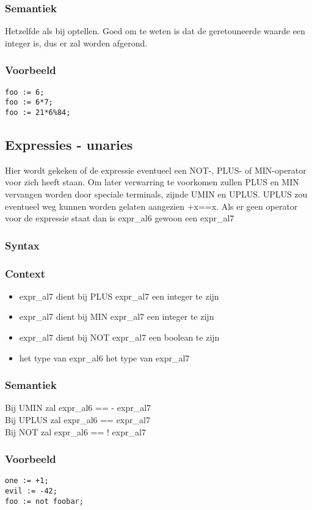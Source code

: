 \documentclass[]{article}
\begin{document}
\subsubsection{Semantiek}
Hetzelfde als bij optellen. Goed om te weten is dat de geretouneerde waarde een integer is, dus er zal worden afgerond.
\subsubsection{Voorbeeld}
\begin{lstlisting}[style=SELMA]
foo := 6;
foo := 6*7;
foo := 21*6%84;
\end{lstlisting}


\subsection{Expressies - unaries}
Hier wordt gekeken of de expressie eventueel een NOT-, PLUS- of MIN-operator voor zich heeft staan.
Om later verwarring te voorkomen zullen PLUS en MIN vervangen worden door speciale terminals, zijnde UMIN en UPLUS. UPLUS zou eventueel weg kunnen worden gelaten aangezien +x==x.
Als er geen operator voor de expressie staat dan is expr\_al6 gewoon een expr\_al7
\subsubsection{Syntax}

\subsubsection{Context}
\begin{itemize}
\item expr\_al7 dient bij PLUS expr\_al7 een integer te zijn
\item expr\_al7 dient bij MIN expr\_al7 een integer te zijn
\item expr\_al7 dient bij NOT expr\_al7 een boolean te zijn
\item het type van expr\_al6 het type van expr\_al7
\end{itemize}
\subsubsection{Semantiek}
Bij UMIN zal expr\_al6 == - expr\_al7 \\
Bij UPLUS zal expr\_al6 == expr\_al7 \\
Bij NOT zal expr\_al6 == ! expr\_al7 
\subsubsection{Voorbeeld}
\begin{lstlisting}[style=SELMA]
one := +1;
evil := -42;
foo := not foobar;
\end{lstlisting}
\end{document}
